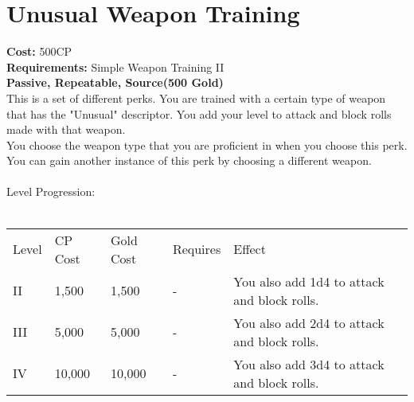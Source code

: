 \section{Unusual Weapon Training}\label{perk:unusualWeaponTraining}
\textbf{Cost:} 500CP\\
\textbf{Requirements:} Simple Weapon Training II\\
\textbf{Passive, Repeatable, Source(500 Gold)}\\
This is a set of different perks.
You are trained with a certain type of weapon that has the "Unusual" descriptor.
You add your level to attack and block rolls made with that weapon.\\
You choose the weapon type that you are proficient in when you choose this perk.
You can gain another instance of this perk by choosing a different weapon.\\
\\
Level Progression:\\
\\
\begin{tabular}{l | l | l | l | l}
	Level & CP Cost & Gold Cost & Requires & Effect\\
	II & 1,500 & 1,500 & - & You also add 1d4 to attack and block rolls.\\
	III & 5,000 & 5,000 & - & You also add 2d4 to attack and block rolls.\\
	IV & 10,000 & 10,000 & - & You also add 3d4 to attack and block rolls.\\
\end{tabular}
